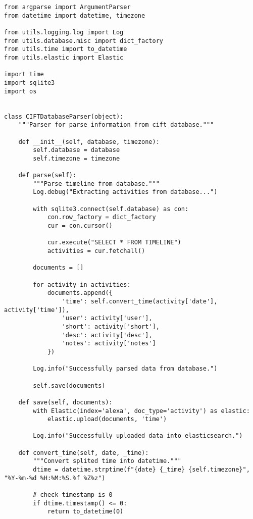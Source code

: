 \documentclass{easychair}
\begin{document}
\lstset{language=Python}
\lstset{frame=lines}
\lstset{basicstyle=\footnotesize}
\begin{lstlisting}
from argparse import ArgumentParser
from datetime import datetime, timezone

from utils.logging.log import Log
from utils.database.misc import dict_factory
from utils.time import to_datetime
from utils.elastic import Elastic

import time
import sqlite3
import os


class CIFTDatabaseParser(object):
    """Parser for parse information from cift database."""

    def __init__(self, database, timezone):
        self.database = database
        self.timezone = timezone

    def parse(self):
        """Parse timeline from database."""
        Log.debug("Extracting activities from database...")

        with sqlite3.connect(self.database) as con:
            con.row_factory = dict_factory
            cur = con.cursor()

            cur.execute("SELECT * FROM TIMELINE")
            activities = cur.fetchall()

        documents = []

        for activity in activities:
            documents.append({
                'time': self.convert_time(activity['date'], activity['time']),
                'user': activity['user'],
                'short': activity['short'],
                'desc': activity['desc'],
                'notes': activity['notes']
            })

        Log.info("Successfully parsed data from database.")

        self.save(documents)

    def save(self, documents):
        with Elastic(index='alexa', doc_type='activity') as elastic:
            elastic.upload(documents, 'time')

        Log.info("Successfully uploaded data into elasticsearch.")

    def convert_time(self, date, _time):
        """Convert splited time into datetime."""
        dtime = datetime.strptime(f"{date} {_time} {self.timezone}", "%Y-%m-%d %H:%M:%S.%f %Z%z")
        
        # check timestamp is 0
        if dtime.timestamp() <= 0:
            return to_datetime(0)


\end{lstlisting}
\end{document}

